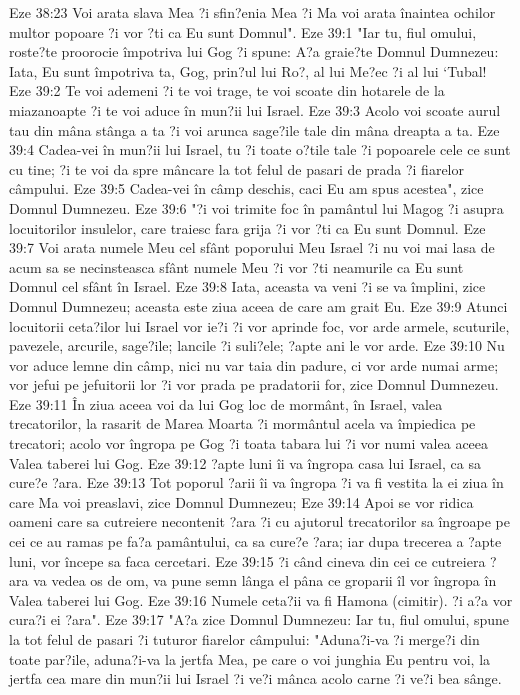 Eze 38:23  Voi arata slava Mea ?i sfin?enia Mea ?i Ma voi arata înaintea ochilor multor popoare ?i vor ?ti ca Eu sunt Domnul".
Eze 39:1  "Iar tu, fiul omului, roste?te proorocie împotriva lui Gog ?i spune: A?a graie?te Domnul Dumnezeu: Iata, Eu sunt împotriva ta, Gog, prin?ul lui Ro?, al lui Me?ec ?i al lui `Tubal!
Eze 39:2  Te voi ademeni ?i te voi trage, te voi scoate din hotarele de la miazanoapte ?i te voi aduce în mun?ii lui Israel.
Eze 39:3  Acolo voi scoate aurul tau din mâna stânga a ta ?i voi arunca sage?ile tale din mâna dreapta a ta.
Eze 39:4  Cadea-vei în mun?ii lui Israel, tu ?i toate o?tile tale ?i popoarele cele ce sunt cu tine; ?i te voi da spre mâncare la tot felul de pasari de prada ?i fiarelor câmpului.
Eze 39:5  Cadea-vei în câmp deschis, caci Eu am spus acestea", zice Domnul Dumnezeu.
Eze 39:6  "?i voi trimite foc în pamântul lui Magog ?i asupra locuitorilor insulelor, care traiesc fara grija ?i vor ?ti ca Eu sunt Domnul.
Eze 39:7  Voi arata numele Meu cel sfânt poporului Meu Israel ?i nu voi mai lasa de acum sa se necinsteasca sfânt numele Meu ?i vor ?ti neamurile ca Eu sunt Domnul cel sfânt în Israel.
Eze 39:8  Iata, aceasta va veni ?i se va împlini, zice Domnul Dumnezeu; aceasta este ziua aceea de care am grait Eu.
Eze 39:9  Atunci locuitorii ceta?ilor lui Israel vor ie?i ?i vor aprinde foc, vor arde armele, scuturile, pavezele, arcurile, sage?ile; lancile ?i suli?ele; ?apte ani le vor arde.
Eze 39:10  Nu vor aduce lemne din câmp, nici nu var taia din padure, ci vor arde numai arme; vor jefui pe jefuitorii lor ?i vor prada pe pradatorii for, zice Domnul Dumnezeu.
Eze 39:11  În ziua aceea voi da lui Gog loc de mormânt, în Israel, valea trecatorilor, la rasarit de Marea Moarta ?i mormântul acela va împiedica pe trecatori; acolo vor îngropa pe Gog ?i toata tabara lui ?i vor numi valea aceea Valea taberei lui Gog.
Eze 39:12  ?apte luni îi va îngropa casa lui Israel, ca sa cure?e ?ara.
Eze 39:13  Tot poporul ?arii îi va îngropa ?i va fi vestita la ei ziua în care Ma voi preaslavi, zice Domnul Dumnezeu;
Eze 39:14  Apoi se vor ridica oameni care sa cutreiere necontenit ?ara ?i cu ajutorul trecatorilor sa îngroape pe cei ce au ramas pe fa?a pamântului, ca sa cure?e ?ara; iar dupa trecerea a ?apte luni, vor începe sa faca cercetari.
Eze 39:15  ?i când cineva din cei ce cutreiera ?ara va vedea os de om, va pune semn lânga el pâna ce groparii îl vor îngropa în Valea taberei lui Gog.
Eze 39:16  Numele ceta?ii va fi Hamona (cimitir). ?i a?a vor cura?i ei ?ara".
Eze 39:17  "A?a zice Domnul Dumnezeu: Iar tu, fiul omului, spune la tot felul de pasari ?i tuturor fiarelor câmpului: "Aduna?i-va ?i merge?i din toate par?ile, aduna?i-va la jertfa Mea, pe care o voi junghia Eu pentru voi, la jertfa cea mare din mun?ii lui Israel ?i ve?i mânca acolo carne ?i ve?i bea sânge.
